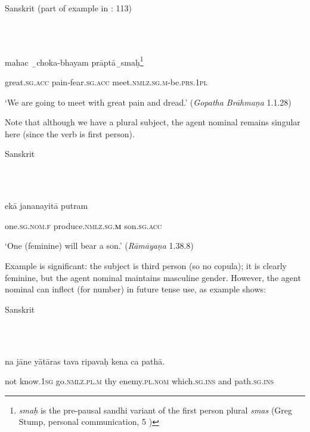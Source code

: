 \documentclass[output=paper]{langscibook}
\begin{document}
Sanskrit (part of example in \citealt{Stump2013}: 113)

\ea%
    \label{ex:key:15}
    \gll \\
         \\
    \glt
    \z %

          mahac  ‿choka-bhayam  prāptā‿smaḥ\footnote{\textrm{\textit{smaḥ}} \textrm{is the pre-pausal sandhi variant of the first person plural} \textrm{\textit{smas} }\textrm{(Greg Stump, personal communication, 5 \citealt{August2013})}}

  great.\textsc{sg.acc}  pain-fear.\textsc{sg.acc}  meet.\textsc{nmlz.sg.m}{}-be.\textsc{prs.1pl}

  ‘We are going to meet with great pain and dread.’  (\textit{Gopatha Brāhmaṇa} 1.1.28)

Note that although we have a plural subject, the agent nominal remains singular here (since the verb is first person). 

Sanskrit \citep[113]{Stump2013}

\ea%
    \label{ex:key:16}
    \gll \\
         \\
    \glt
    \z %

          ekā  jananayitā  putram

  one.\textsc{sg.nom}.\textsc{f}  produce.\textsc{nmlz.sg.}\textbf{\textsc{m}}  son.\textsc{sg.acc}

  ‘One (feminine) will bear a son.’    (\textit{Rāmāyaṇa} 1.38.8)

Example  is significant: the subject is third person (so no copula); it is clearly feminine, but the agent nominal maintains masculine gender. However, the agent nominal can inflect (for number) in future tense use, as example  shows: 

Sanskrit \citep[114]{Stump2013}

\ea%
    \label{ex:key:17}
    \gll \\
         \\
    \glt
    \z %

          na  jāne  yātāras  tava  ripavaḥ  kena  ca  pathā.

  not  know.\textsc{1sg}  go.\textsc{nmlz.pl.m}  thy  enemy.\textsc{pl.nom}  which.\textsc{sg.ins}  and  path.\textsc{sg.ins}
\end{document}
